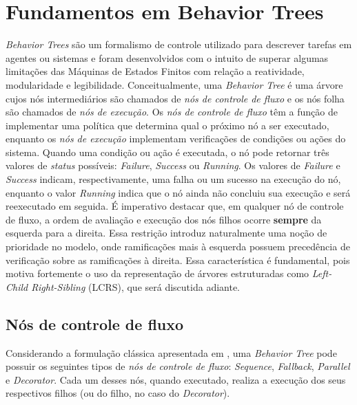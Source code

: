 \documentclass[conference]{IEEEtran}
\begin{document}

\section{Fundamentos em Behavior Trees}

\textit{Behavior Trees} são um formalismo de controle utilizado para descrever tarefas em agentes ou sistemas e foram desenvolvidos com o intuito de superar algumas limitações das Máquinas de Estados Finitos com relação a reatividade, modularidade e legibilidade. Conceitualmente, uma \textit{Behavior Tree} é uma árvore cujos nós intermediários são chamados de \textit{nós de controle de fluxo} e os nós folha são chamados de \textit{nós de execução}.
Os \textit{nós de controle de fluxo} têm a função de implementar uma política que determina qual o próximo nó a ser executado, enquanto os \textit{nós de execução} implementam verificações de condições ou ações do sistema.
Quando uma condição ou ação é executada, o nó pode retornar três valores de \textit{status} possíveis: \textit{Failure}, \textit{Success} ou \textit{Running}. Os valores de \textit{Failure} e \textit{Success} indicam, respectivamente, uma falha ou um sucesso na execução do nó, enquanto o valor \textit{Running} indica que o nó ainda não concluiu sua execução e será reexecutado em seguida.
É imperativo destacar que, em qualquer nó de controle de fluxo, a ordem de avaliação e execução dos nós filhos ocorre \textbf{sempre} da esquerda para a direita. Essa restrição introduz naturalmente uma noção de prioridade no modelo, onde ramificações mais à esquerda possuem precedência de verificação sobre as ramificações à direita. Essa característica é fundamental, pois motiva fortemente o uso da representação de árvores estruturadas como \textit{Left-Child Right-Sibling} (LCRS), que será discutida adiante.

\subsection{Nós de controle de fluxo}

Considerando a formulação clássica apresentada em \cite{colledanchise_behavior_2018}, uma \textit{Behavior Tree} pode possuir os seguintes tipos de \textit{nós de controle de fluxo}: \textit{Sequence}, \textit{Fallback}, \textit{Parallel} e \textit{Decorator}.
Cada um desses nós, quando executado, realiza a execução dos seus respectivos filhos (ou do filho, no caso do \textit{Decorator}).
\end{document}
